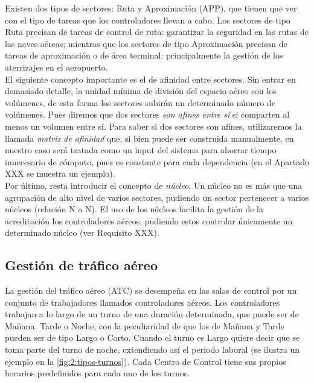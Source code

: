 Existen dos tipos de sectores: Ruta y Aproximación (APP), que tienen que ver con el tipo de tareas que los 
controladores llevan a cabo.
Los sectores de tipo Ruta precisan de tareas de control de ruta: garantizar la seguridad en las rutas de las naves 
aéreas; mientras que los sectores de tipo Aproximación precisan de tareas de aproximación o de área terminal: 
principalmente la gestión de los aterrizajes en el aeropuerto.
\\

El siguiente concepto importante es el de afinidad entre sectores. Sin entrar en demasiado detalle, la unidad mínima de
división del espacio aéreo son los volúmenes, de esta forma los sectores subirán un determinado número de volúmenes.
Pues diremos que dos sectores \textit{son afines entre sí} si comparten al menos un volumen entre sí. Para saber si dos
sectores son afines, utilizaremos la llamada \textit{matriz de afinidad} que, si bien puede ser construida manualmente,
en nuestro caso será tratada como un input del sistema para ahorrar tiempo innecesario de cómputo, pues es constante 
para cada dependencia (en el Apartado XXX se muestra un ejemplo). %
\\

Por último, resta introducir el concepto de \textit{núcleo}. Un núcleo no es más que una agrupación de alto nivel de
varios sectores, pudiendo un sector pertenecer a varios núcleos (relación N a N). El uso de los núcleos facilita la
gestión de la acreditación los controladores aéreos, pudiendo estos controlar únicamente un determinado núcleo (ver 
Requisito XXX). %


\subsection{Gestión de tráfico aéreo}
La gestión del tráfico aéreo (\gls{ATC}) se desempeña en las salas de control por un conjunto de trabajadores 
llamados controladores aéreos. Los controladores trabajan a lo largo de un turno de una duración determinada, que puede 
ser de Mañana, Tarde o Noche, con la peculiaridad de que los de Mañana y Tarde pueden ser de tipo Largo o Corto. Cuando 
el turno es Largo quiere decir que se toma parte del turno de noche, extendiendo así el periodo laboral (se ilustra un 
ejemplo en la \autoref{fig:2:tipos-turnos}). Cada \acrlong{Centro de Control} tiene sus propios horarios predefinidos 
para cada uno de los turnos.
\\

